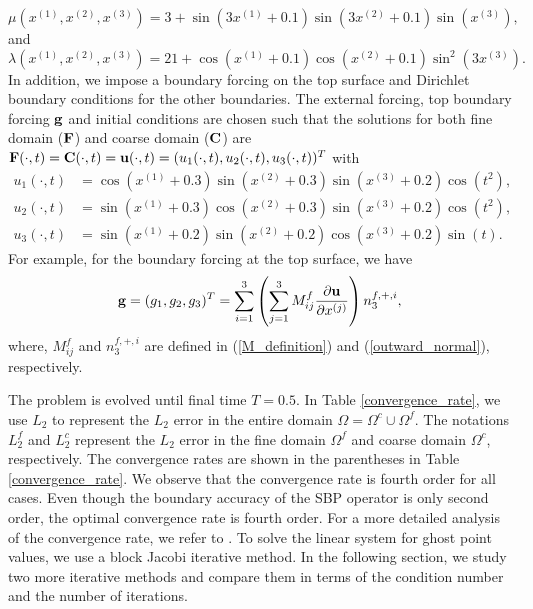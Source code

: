 \begin{equation*}\label{mu_function}
\mu(x^{(1)},x^{(2)},x^{(3)}) = 3 + \sin(3x^{(1)}+0.1)\sin(3x^{(2)}+0.1)\sin(x^{(3)}),
\end{equation*}
and 
\begin{equation*}\label{lambda_function}
\lambda(x^{(1)},x^{(2)},x^{(3)})  = 21+ \cos(x^{(1)}+0.1)\cos(x^{(2)}+0.1)\sin^2(3x^{(3)}).
\end{equation*}
 In addition, we impose a boundary forcing on the top surface and Dirichlet boundary conditions for the other boundaries. The external forcing, top boundary forcing ${\bf g}$ and initial conditions are chosen such that the solutions for both fine domain ($\bf F$) and coarse domain ($\bf C$) are ${\bf F}(\cdot,t) = {\bf C}(\cdot,t) = {\bf u}(\cdot,t) = (u_1(\cdot,t),u_2(\cdot,t),u_3(\cdot,t))^T$ with
\begin{align*}
u_1(\cdot,t) &= \cos(x^{(1)}+0.3)\sin(x^{(2)}+0.3)\sin(x^{(3)}+0.2)\cos(t^2),\\
u_2(\cdot,t) &= \sin(x^{(1)}+0.3)\cos(x^{(2)}+0.3)\sin(x^{(3)}+0.2)\cos(t^2),\\
u_3(\cdot,t) &= \sin(x^{(1)}+0.2)\sin(x^{(2)}+0.2)\cos(x^{(3)}+0.2)\sin(t).
\end{align*}
For example, for the boundary forcing at the top surface, we have 
\begin{equation*}\label{traction_force}
{\bf g} = (g_1,g_2,g_3)^T = \sum_{i=1}^3\left(\sum_{j = 1}^3 M_{ij}^f\frac{\partial{\bf u}}{\partial x^{(j)}}\right) n^{f,+,i}_3,
\end{equation*}
where, $M_{ij}^f$ and $n^{f,+,i}_3$ are defined in (\ref{M_definition}) and (\ref{outward_normal}), respectively.

The problem is evolved until final time $T = 0.5$. In Table \ref{convergence_rate}, we use $L_2$ to represent the $L_2$ error in the entire domain $\Omega = \Omega^c\cup\Omega^f$. The notations $L_2^f$ and $L_2^c$ represent the $L_2$ error in the fine domain $\Omega^f$ and  coarse domain $\Omega^c$, respectively. The convergence rates are shown in the parentheses in Table \ref{convergence_rate}. We observe that the convergence rate is fourth order for all cases. Even though the boundary accuracy of the SBP operator is only second order, the optimal convergence rate is fourth order. For a more detailed analysis of the convergence rate, we refer to \cite{Wang2017, Wang2018b}.  To solve the linear system for ghost point values, we use a block Jacobi iterative method. In the following section, we study two more iterative methods and compare them in terms of the condition number and the number of iterations.

